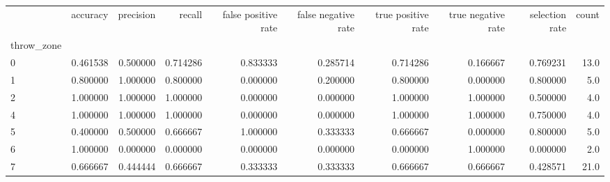 \begin{tabular}{lrrrrrrrrr}
\toprule
{} &  accuracy &  precision &    recall &  false positive rate &  false negative rate &  true positive rate &  true negative rate &  selection rate &  count \\
throw\_zone &           &            &           &                      &                      &                     &                     &                 &        \\
\midrule
0          &  0.461538 &   0.500000 &  0.714286 &             0.833333 &             0.285714 &            0.714286 &            0.166667 &        0.769231 &   13.0 \\
1          &  0.800000 &   1.000000 &  0.800000 &             0.000000 &             0.200000 &            0.800000 &            0.000000 &        0.800000 &    5.0 \\
2          &  1.000000 &   1.000000 &  1.000000 &             0.000000 &             0.000000 &            1.000000 &            1.000000 &        0.500000 &    4.0 \\
4          &  1.000000 &   1.000000 &  1.000000 &             0.000000 &             0.000000 &            1.000000 &            1.000000 &        0.750000 &    4.0 \\
5          &  0.400000 &   0.500000 &  0.666667 &             1.000000 &             0.333333 &            0.666667 &            0.000000 &        0.800000 &    5.0 \\
6          &  1.000000 &   0.000000 &  0.000000 &             0.000000 &             0.000000 &            0.000000 &            1.000000 &        0.000000 &    2.0 \\
7          &  0.666667 &   0.444444 &  0.666667 &             0.333333 &             0.333333 &            0.666667 &            0.666667 &        0.428571 &   21.0 \\
\bottomrule
\end{tabular}
